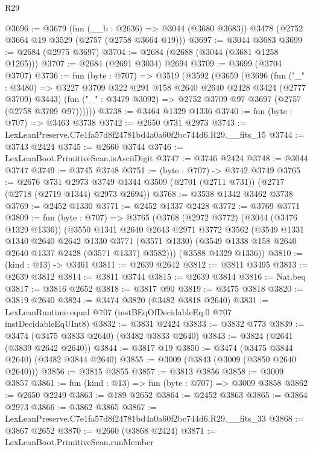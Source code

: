 \begin{lexlean}{R29}
\begin{coremodule}
@3696 := @3679
    (fun (__b : @2636) => @3044 (@3680 @3683))
    @3478
    (@2752 @3664 @19 @3529 (@2757 (@2758 @3664 @19)))
@3697 := @3044 @3683
@3699 := @2684 (@2975 @3697)
@3704 := @2684 (@2688 (@3044 (@3681 @1258 @1265)))
@3707 := @2684 (@2691 @3034) @2694
@3709 := @3699 (@3704 @3707)
@3736 := fun (byte : @707) =>
  @3519
    (@3592
      (@3659
        (@3696
          (fun ("_" : @3480) =>
          @3227 @3709 @322 @291 @158 @2640 @2640 @2428 @3424 (@2777 @3709) @3443)
          (fun ("_" : @3479 @3092) => @2752 @3709 @97 @3697 (@2757 (@2758 @3709 @97))))))
@3738 := @3464 @1329 @1336
@3740 := fun (byte : @707) => @3463 @3738
@3742 := @2650 @731 @2973
@3743 := LexLeanPreserve.C7e1fa57d8f24781bd4a0a60f2bc744d6.R29.__fits_15
@3744 := @3743 @2424
@3745 := @2660 @3744
@3746 := LexLeanBoot.PrimitiveScan.isAsciiDigit
@3747 := @3746 @2424
@3748 := @3044 @3747
@3749 := @3745 @3748
@3751 := (byte : @707) -> @3742 @3749
@3765 := @2676
    @731
    @2973
    @3749
    @1344
    @3509
    (@2701 (@2711 @731))
    (@2717 (@2718 (@2719 @1344) @2973 @2694))
@3768 := @3538 @1342 @3462 @3738
@3769 := @2452 @1330
@3771 := @2452 @1337 @2428
@3772 := @3769 @3771
@3809 := fun (byte : @707) =>
  @3765
    (@3768
      (@2972 @3772)
      (@3044 (@3476 @1329 @1336))
      (@3550
        @1341
        @2640
        @2643
        @2971
        @3772
        @3562
        (@3549
          @1331
          @1340
          @2640
          @2642
          @1330
          @3771
          (@3571 @1330)
          (@3549 @1338 @158 @2640 @2640 @1337 @2428 (@3571 @1337) @3582)))
      (@3588 @1329 @1336))
@3810 := (kind : @13) -> @3461
@3811 := @2639 @2642
@3812 := @3811 @3495
@3813 := @2639 @3812
@3814 := @3811 @3744
@3815 := @2639 @3814
@3816 := Nat.beq
@3817 := @3816 @2652
@3818 := @3817 @90
@3819 := @3475 @3818
@3820 := @3819 @2640
@3824 := @3474 @3820 (@3482 @3818 @2640)
@3831 := LexLeanRuntime.equal @707 (instBEqOfDecidableEq.{0} @707 instDecidableEqUInt8)
@3832 := @3831 @2424
@3833 := @3832 @773
@3839 := @3474 (@3475 @3833 @2640) (@3482 @3833 @2640)
@3843 := @3824 (@2641 (@3839 @2642 @2640))
@3844 := @3817 @19
@3850 := @3474 (@3475 @3844 @2640) (@3482 @3844 @2640)
@3855 := @3009 (@3843 (@3009 (@3850 @2640 @2640)))
@3856 := @3815 @3855
@3857 := @3813 @3856
@3858 := @3009 @3857
@3861 := fun (kind : @13) => fun (byte : @707) => @3009 @3858
@3862 := @2650 @2249
@3863 := @189 @2652
@3864 := @2452 @3863
@3865 := @3864 @2973
@3866 := @3862 @3865
@3867 := LexLeanPreserve.C7e1fa57d8f24781bd4a0a60f2bc744d6.R29.__fits_33
@3868 := @3867 @2652
@3870 := @2660 (@3868 @2424)
@3871 := LexLeanBoot.PrimitiveScan.runMember

\end{coremodule}
\end{lexlean}
